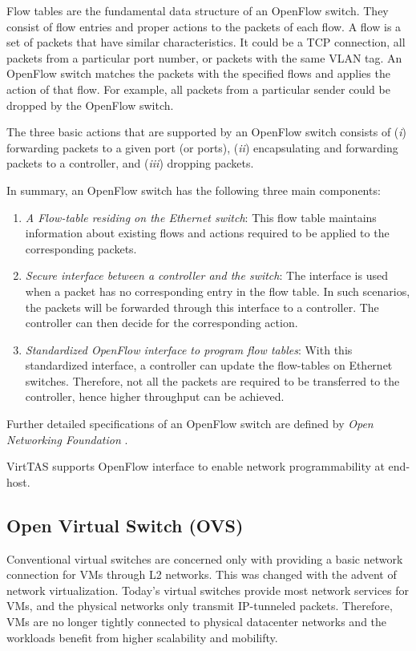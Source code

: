 Flow tables are the fundamental data structure of an OpenFlow switch. They consist of flow 
entries and proper actions to the packets of each flow. A flow is a set of packets that have 
similar characteristics. It could be a TCP connection, all packets from a particular port 
number, or packets with the same VLAN tag. An OpenFlow switch matches the packets with the 
specified flows and applies the action of that flow. For example, all packets from a 
particular sender could be dropped by the OpenFlow switch. 

The three basic actions that are supported by an OpenFlow switch consists of (\emph{i}) 
forwarding packets to a given port (or ports), (\emph{ii}) encapsulating and forwarding 
packets to a controller, and (\emph{iii}) dropping packets.


In summary, an OpenFlow switch has the following three main components:
\begin{enumerate}
    \item \emph{A Flow-table residing on the Ethernet switch}: This flow table maintains 
    information about existing flows and actions required to be applied to the corresponding 
    packets.
    \item \emph{Secure interface between a controller and the switch}: The interface is used 
    when a packet has no corresponding entry in the flow table. In such scenarios, the packets 
    will be forwarded through this interface to a controller. The controller can then decide 
    for the corresponding action.
    \item \emph{Standardized OpenFlow interface to program flow tables}: With this standardized
    interface, a controller can update the flow-tables on Ethernet switches. Therefore, not 
    all the packets are required to be transferred to the controller, hence higher throughput 
    can be achieved. 
\end{enumerate}

Further detailed specifications of an OpenFlow switch are defined by 
\emph{Open Networking Foundation} \cite{specification2009version}. 

VirtTAS supports OpenFlow interface to enable network programmability at end-host.

\subsection{Open Virtual Switch (OVS)}
\label{OVS}

Conventional virtual switches are concerned only with providing a basic network connection 
for VMs through L2 networks. This was changed with the advent of network virtualization. 
Today's virtual switches provide most network services for VMs, and the physical networks 
only transmit IP-tunneled packets. Therefore, VMs are no longer tightly connected to physical 
datacenter networks and the workloads benefit from higher scalability and mobilifty.

